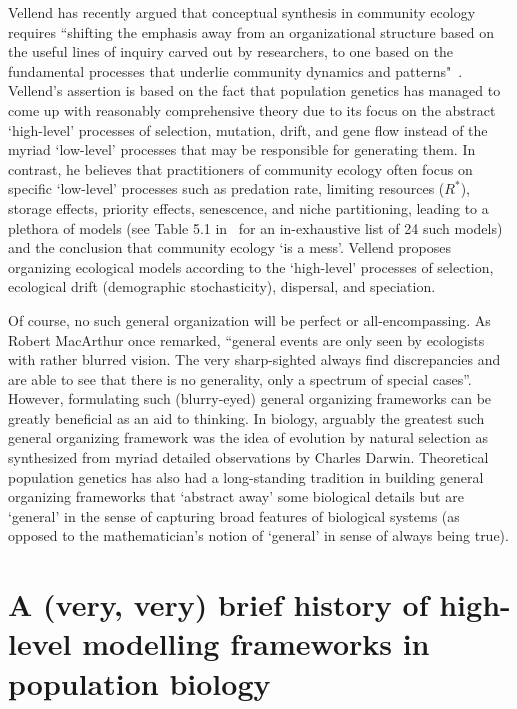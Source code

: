 Vellend has recently argued that conceptual synthesis in community ecology requires ``shifting the emphasis away from an organizational structure based on the useful lines of inquiry carved out by researchers, to one based on the fundamental processes that underlie community dynamics and patterns"~\citep{vellend_theory_2016}. Vellend's assertion is based on the fact that population genetics has managed to come up with reasonably comprehensive theory due to its focus on the abstract `high-level' processes of selection, mutation, drift, and gene flow instead of the myriad `low-level' processes that may be responsible for generating them. In contrast, he believes that practitioners of community ecology often focus on specific `low-level' processes such as predation rate, limiting resources ($R^*$), storage effects, priority effects, senescence, and niche partitioning, leading to a plethora of models (see Table 5.1 in~\citep{vellend_theory_2016} for an in-exhaustive list of 24 such models) and the conclusion that community ecology `is a mess'. Vellend proposes organizing ecological models according to the `high-level' processes of selection, ecological drift (demographic stochasticity), dispersal, and speciation.

Of course, no such general organization will be perfect or all-encompassing. As Robert MacArthur once remarked, ``general events are only seen by ecologists with rather blurred vision. The very sharp-sighted always find discrepancies and are able to see that there is no generality, only a spectrum of special cases”\citep{kingsland_modeling_1985}. However, formulating such (blurry-eyed) general organizing frameworks can be greatly beneficial as an aid to thinking. In biology, arguably the greatest such general organizing framework was the idea of evolution by natural selection as synthesized from myriad detailed observations by Charles Darwin. Theoretical population genetics has also had a long-standing tradition in building general organizing frameworks that `abstract away' some biological details but are `general' in the sense of capturing broad features of biological systems (as opposed to the mathematician's notion of `general' in sense of always being true).

\section{A (very, very) brief history of high-level modelling frameworks in population biology}


